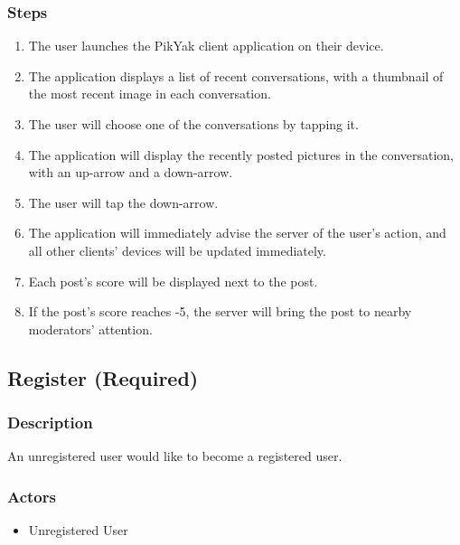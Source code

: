 \documentclass[11pt]{scrartcl}
\begin{document}
        \subsubsection{Steps}
            \begin{enumerate}
                \item The user launches the PikYak client application on their device.
                \item The application displays a list of recent conversations, with a thumbnail of the most recent image in each conversation.
                \item The user will choose one of the conversations by tapping it.
                \item The application will display the recently posted pictures in the conversation, with an up-arrow and a down-arrow.
                \item The user will tap the down-arrow.
                \item The application will immediately advise the server of the user's action, and all other clients' devices will be updated immediately.
                \item Each post's score will be displayed next to the post.
                \item If the post's score reaches -5, the server will bring the post to nearby moderators' attention.
            \end{enumerate}

    \subsection{Register (Required)}
    \label{sec:register}
        \subsubsection{Description}
            An unregistered user would like to become a registered user.
        \subsubsection{Actors}
            \begin{itemize}
                \item Unregistered User
            \end{itemize}
\end{document}
